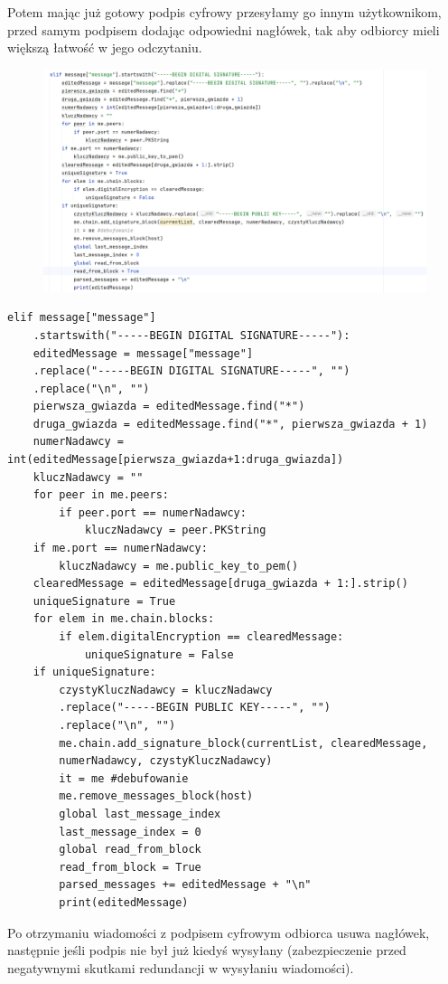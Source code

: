 Potem mając już gotowy podpis cyfrowy przesyłamy go innym użytkownikom, przed samym podpisem dodając odpowiedni nagłówek, tak aby odbiorcy mieli większą łatwość w jego odczytaniu.
\begin{figure}[H]
    \centering
    \includegraphics[width=\textwidth]{Images/Code7.png}
\end{figure}
\begin{lstlisting}
elif message["message"]
    .startswith("-----BEGIN DIGITAL SIGNATURE-----"):
    editedMessage = message["message"]
    .replace("-----BEGIN DIGITAL SIGNATURE-----", "")
    .replace("\n", "")
    pierwsza_gwiazda = editedMessage.find("*")
    druga_gwiazda = editedMessage.find("*", pierwsza_gwiazda + 1)
    numerNadawcy = int(editedMessage[pierwsza_gwiazda+1:druga_gwiazda])
    kluczNadawcy = ""
    for peer in me.peers:
        if peer.port == numerNadawcy:
            kluczNadawcy = peer.PKString
    if me.port == numerNadawcy:
        kluczNadawcy = me.public_key_to_pem()
    clearedMessage = editedMessage[druga_gwiazda + 1:].strip()
    uniqueSignature = True
    for elem in me.chain.blocks:
        if elem.digitalEncryption == clearedMessage:
            uniqueSignature = False
    if uniqueSignature:
        czystyKluczNadawcy = kluczNadawcy
        .replace("-----BEGIN PUBLIC KEY-----", "")
        .replace("\n", "")
        me.chain.add_signature_block(currentList, clearedMessage,
        numerNadawcy, czystyKluczNadawcy)
        it = me #debufowanie
        me.remove_messages_block(host)
        global last_message_index
        last_message_index = 0
        global read_from_block
        read_from_block = True
        parsed_messages += editedMessage + "\n"
        print(editedMessage)
\end{lstlisting}
Po otrzymaniu wiadomości z podpisem cyfrowym odbiorca usuwa nagłówek, następnie jeśli podpis nie był już kiedyś wysyłany (zabezpieczenie przed negatywnymi skutkami redundancji w wysyłaniu wiadomości).
